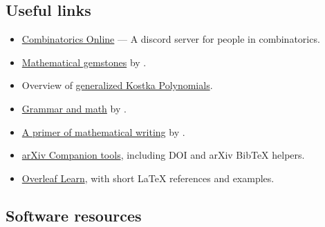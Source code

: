 \subsection[generalUsefulThings]{Useful links}

\begin{itemize}

\item {} \href{https://sites.google.com/u.northwestern.edu/combinatorics-online/home}{Combinatorics Online} --- A discord server for people in combinatorics.

\item {}  \href{http://www.mathematicalgemstones.com/}{Mathematical gemstones} by .

\item {}  Overview of \href{https://www.aimath.org/WWN/kostka/}{generalized Kostka Polynomials}.

\item {} \href{https://faculty.math.illinois.edu/~west/grammar.html}{Grammar and math} by .

\item {} \href{https://arxiv.org/pdf/1612.04888.pdf}{A primer of mathematical writing} by .

\item {} \href{https://arxiv.symmetricfunctions.com/tools}{arXiv Companion tools}, including DOI and arXiv BibTeX helpers.

\item {} \href{https://www.overleaf.com/learn}{Overleaf Learn}, with short \LaTeX{} references and examples.

\end{itemize}


\subsection[softwareLinks]{Software resources}

